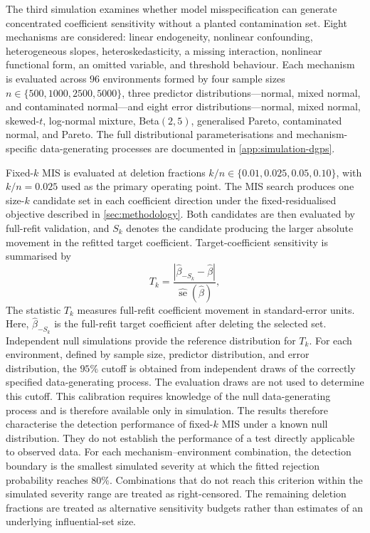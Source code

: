 \documentclass[../main.tex]{subfiles}
\begin{document}
The third simulation examines whether model misspecification can generate concentrated coefficient sensitivity without a planted contamination set. Eight mechanisms are considered: linear endogeneity, nonlinear confounding, heterogeneous slopes, heteroskedasticity, a missing interaction, nonlinear functional form, an omitted variable, and threshold behaviour. Each mechanism is evaluated across \(96\) environments formed by four sample sizes \(n\in\{500,1000,2500,5000\}\), three predictor distributions---normal, mixed normal, and contaminated normal---and eight error distributions---normal, mixed normal, skewed-\(t\), log-normal mixture, Beta\((2,5)\), generalised Pareto, contaminated normal, and Pareto. The full distributional parameterisations and mechanism-specific data-generating processes are documented in \autoref{app:simulation-dgps}.

Fixed-\(k\) MIS is evaluated at deletion fractions \(k/n\in\{0.01,0.025,0.05,0.10\}\), with \(k/n=0.025\) used as the primary operating point. The MIS search produces one size-\(k\) candidate set in each coefficient direction under the fixed-residualised objective described in \autoref{sec:methodology}. Both candidates are then evaluated by full-refit validation, and \(S_k\) denotes the candidate producing the larger absolute movement in the refitted target coefficient. Target-coefficient sensitivity is summarised by
\[
T_k
=
\frac{
\left|
\widehat{\beta}_{-S_k}-\widehat{\beta}
\right|
}{
\widehat{\operatorname{se}}(\widehat{\beta})
},
\]
The statistic \(T_k\) measures full-refit coefficient movement in standard-error units. Here, \(\widehat{\beta}_{-S_k}\) is the full-refit target coefficient after deleting the selected set. Independent null simulations provide the reference distribution for \(T_k\). For each environment, defined by sample size, predictor distribution, and error distribution, the \(95\%\) cutoff is obtained from independent draws of the correctly specified data-generating process. The evaluation draws are not used to determine this cutoff. This calibration requires knowledge of the null data-generating process and is therefore available only in simulation. The results therefore characterise the detection performance of fixed-\(k\) MIS under a known null distribution. They do not establish the performance of a test directly applicable to observed data. For each mechanism--environment combination, the detection boundary is the smallest simulated severity at which the fitted rejection probability reaches \(80\%\). Combinations that do not reach this criterion within the simulated severity range are treated as right-censored. The remaining deletion fractions are treated as alternative sensitivity budgets rather than estimates of an underlying influential-set size.
\end{document}
